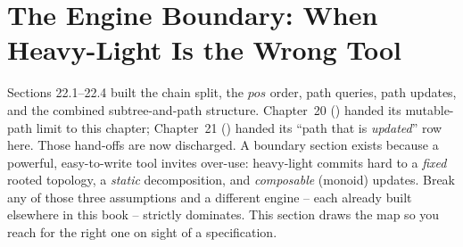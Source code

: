 \section{The Engine Boundary: When Heavy-Light Is the Wrong Tool}\label{sec:c16-boundary}

\begin{previouslybox}
Sections 22.1--22.4 built the chain split, the \(\mathit{pos}\) order, path queries, path updates, and the combined subtree-and-path structure.  Chapter~20 () handed its mutable-path limit to this chapter; Chapter~21 () handed its ``path that is \emph{updated}'' row here.  Those hand-offs are now discharged.  A boundary section exists because a powerful, easy-to-write tool invites over-use: heavy-light commits hard to a \emph{fixed} rooted topology, a \emph{static} decomposition, and \emph{composable} (monoid) updates.  Break any of those three assumptions and a different engine -- each already built elsewhere in this book -- strictly dominates.  This section draws the map so you reach for the right one on sight of a specification.
\end{previouslybox}

